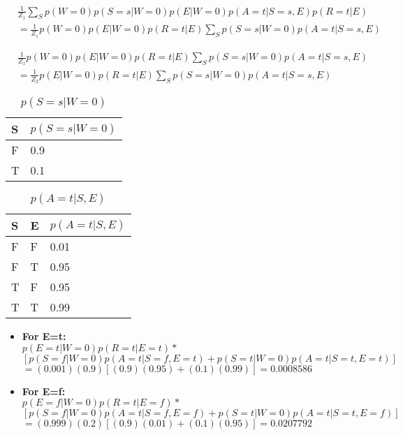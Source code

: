 \documentclass{article}
\begin{document}
\begin{enumerate}[label=(\alph*)]
\begin{enumerate}[label=\roman*.]
\begin{align*}
&\frac{1}{Z_1}\sum_S p(W=0)p(S=s|W=0)p(E|W=0)p(A=t|S=s,E)p(R=t|E) \\
&= \frac{1}{Z_1}p(W=0)p(E|W=0)p(R=t|E)\sum_S p(S=s|W=0)p(A=t|S=s,E)
\end{align*}


\begin{align*}
& \frac{1}{Z_1}p(W=0)p(E|W=0)p(R=t|E)\sum_S p(S=s|W=0)p(A=t|S=s,E) \\
&= \frac{1}{Z_2}p(E|W=0)p(R=t|E)\sum_S p(S=s|W=0)p(A=t|S=s,E)
\end{align*}

\begin{table}[h]
\centering
\caption{$p(S=s|W=0)$}
\label{table:tbla}
\begin{tabular}{|l|l|}
\hline
 S & $p(S=s|W=0)$   \\
\hline \hline
 F & 0.9  \\
 T & 0.1  \\
\hline
\end{tabular}
\end{table}

\begin{table}[h]
\centering
\caption{$p(A=t|S,E)$}
\label{table:tblb}
\begin{tabular}{|l|l|l|}
\hline
 S & E & $p(A=t|S,E)$   \\
\hline \hline
 F & F & 0.01  \\
 F & T & 0.95  \\
 T & F & 0.95  \\
 T & T & 0.99 \\
\hline
\end{tabular}
\end{table}

\begin{itemize}

\item \textbf{For E=t:} \\
$p(E=t|W=0)p(R=t|E=t)*$ \\
$[p(S=f|W=0)p(A=t|S=f,E=t)+p(S=t|W=0)p(A=t|S=t,E=t)]$ \\
$=(0.001)(0.9)[(0.9)(0.95)+(0.1)(0.99)]=0.0008586$

\item \textbf{For E=f:} \\
$p(E=f|W=0)p(R=t|E=f)*$ \\
$[p(S=f|W=0)p(A=t|S=f,E=f)+p(S=t|W=0)p(A=t|S=t,E=f)]$ \\
$=(0.999)(0.2)[(0.9)(0.01)+(0.1)(0.95)]=0.0207792$


\end{itemize}
\end{enumerate}
\end{enumerate}
\end{document}
